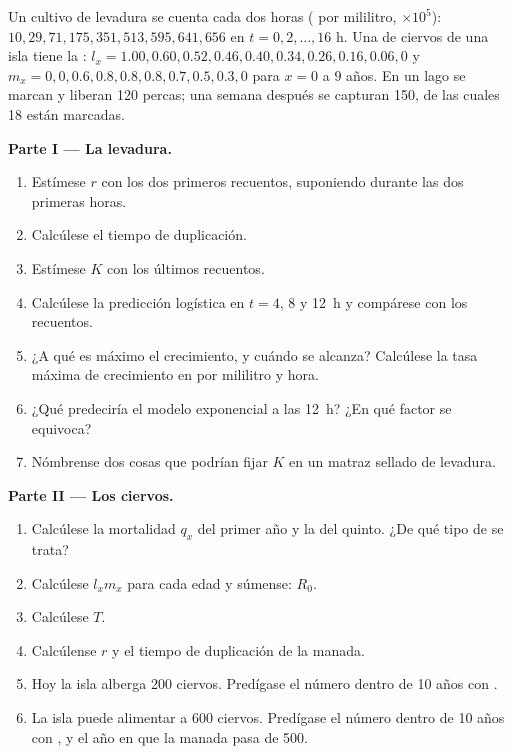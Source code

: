 \begin{problem}
\label{pb:b1:populations:1}
Un cultivo de levadura se cuenta cada dos horas ( por mililitro,
$\times 10^5$): $10, 29, 71, 175, 351, 513, 595, 641, 656$ en $t = 0,
2, \ldots, 16$ h. Una  de ciervos de una isla tiene la : $l_x = 1.00, 0.60, 0.52, 0.46, 0.40, 0.34, 0.26, 0.16, 0.06, 0$ y
$m_x = 0, 0, 0.6, 0.8, 0.8, 0.8, 0.7, 0.5, 0.3, 0$ para $x = 0$ a $9$
años. En un lago se marcan y liberan 120 percas; una semana después se
capturan 150, de las cuales 18 están marcadas.

\medskip
\noindent\textbf{Parte I --- La levadura.}
\begin{enumerate}
  \item Estímese $r$ con los dos primeros recuentos, suponiendo  durante las dos primeras horas.
  \item Calcúlese el tiempo de duplicación.
  \item Estímese $K$ con los últimos recuentos.
  \item Calcúlese la predicción logística en $t = 4$, $8$ y \qty{12}{h} y
        compárese con los recuentos.
  \item ¿A qué  es máximo el crecimiento, y cuándo se alcanza?
        Calcúlese la tasa máxima de crecimiento en  por mililitro y
        hora.
  \item ¿Qué predeciría el modelo exponencial a las \qty{12}{h}? ¿En qué
        factor se equivoca?
  \item Nómbrense dos cosas que podrían fijar $K$ en un matraz sellado de
        levadura.
\end{enumerate}

\medskip
\noindent\textbf{Parte II --- Los ciervos.}
\begin{enumerate}[resume]
  \item Calcúlese la mortalidad $q_x$ del primer año y la del quinto. ¿De
        qué tipo de  se trata?
  \item Calcúlese $l_x m_x$ para cada edad y súmense: $R_0$.
  \item Calcúlese $T$.
  \item Calcúlense $r$ y el tiempo de duplicación de la manada.
  \item Hoy la isla alberga 200 ciervos. Predígase el número dentro de 10
        años con .
  \item La isla puede alimentar a 600 ciervos. Predígase el número dentro de
        10 años con , y el año en que la manada pasa de
        500.
\end{enumerate}


\end{problem}
